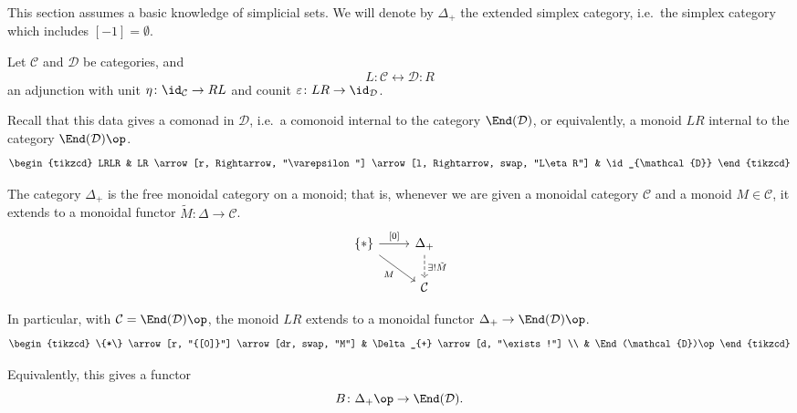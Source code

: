 \documentclass[main.tex]{subfiles}
\begin{document}
This section assumes a basic knowledge of simplicial sets. We will denote by $\Delta_{+}$ the extended simplex category, i.e.\ the simplex category which includes $[-1] = \emptyset$.

Let $\mathcal{C}$ and $\mathcal{D}$ be categories, and
\begin{equation*}
  L : \mathcal{C} \leftrightarrow \mathcal{D} : R
\end{equation*}
an adjunction with unit $\eta\colon \id_{\mathcal{C}} \to RL$ and counit $\varepsilon\colon LR \to \id_{\mathcal{D}}$.

Recall that this data gives a comonad in $\mathcal{D}$, i.e.\ a comonoid internal to the category $\End(\mathcal{D})$, or equivalently, a monoid $LR$ internal to the category $\End(\mathcal{D})\op$.
\begin{equation*}
  \begin{tikzcd}
    LRLR
    & LR
    \arrow[r, Rightarrow, "\varepsilon"]
    \arrow[l, Rightarrow, swap, "L\eta R"]
    & \id_{\mathcal{D}}
  \end{tikzcd}
\end{equation*}

The category $\Delta_{+}$ is the free monoidal category on a monoid; that is, whenever we are given a monoidal category $\mathcal{C}$ and a monoid $M \in \mathcal{C}$, it extends to a monoidal functor $\tilde{M}\colon \Delta \to \mathcal{C}$.
\begin{equation*}
  \begin{tikzcd}
    \{*\}
    \arrow[r, "{[0]}"]
    \arrow[dr, swap, "M"]
    & \Delta_{+}
    \arrow[d, dashed, "\exists! \tilde{M}"]
    \\
    & \mathcal{C}
  \end{tikzcd}
\end{equation*}

In particular, with $\mathcal{C} = \End(\mathcal{D})\op$, the monoid $LR$ extends to a monoidal functor $\Delta_{+} \to \End(\mathcal{D})\op$.
\begin{equation*}
  \begin{tikzcd}
    \{*\}
    \arrow[r, "{[0]}"]
    \arrow[dr, swap, "M"]
    & \Delta_{+}
    \arrow[d, "\exists!"]
    \\
    & \End(\mathcal{D})\op
  \end{tikzcd}
\end{equation*}

Equivalently, this gives a functor
\begin{equation*}
  B\colon \Delta_{+}\op \to \End(\mathcal{D}).
\end{equation*}
\end{document}
